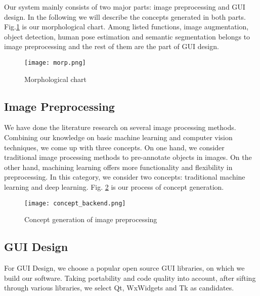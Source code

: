 Our system mainly consists of two major parts: image preprocessing and GUI design. In the following we will describe the concepts generated in both parts. Fig.\ref{fig:MorphChart} is our morphological chart. Among listed functions, image augmentation, object detection, human pose estimation and semantic segmentation belongs to image preprocessing and the rest of them are the part of GUI design.
\begin{figure}[h!]
  \centering \texttt{[image: morp.png]}
  \caption{Morphological chart}
  \label{fig:MorphChart}
\end{figure}

\subsection{Image Preprocessing}
We have done the literature research on several image processing methods. Combining our knowledge on basic machine learning and computer vision techniques, we come up with three concepts. On one hand, we consider traditional image processing methods to pre-annotate objects in images. On the other hand, machining learning offers more functionality and flexibility in preprocessing. In this category, we consider two concepts: traditional machine learning and deep learning. Fig. \ref{fig:backend} is our process of concept generation.
\begin{figure}[h!]
  \centering \texttt{[image: concept\_backend.png]}
  \caption{Concept generation of image preprocessing}
  \label{fig:backend}
\end{figure}


\subsection{GUI Design}
For GUI Design, we choose a popular open source GUI libraries, on which we build our software. Taking portability and code quality into account, after sifting through various libraries, we select Qt, WxWidgets and Tk as candidates.